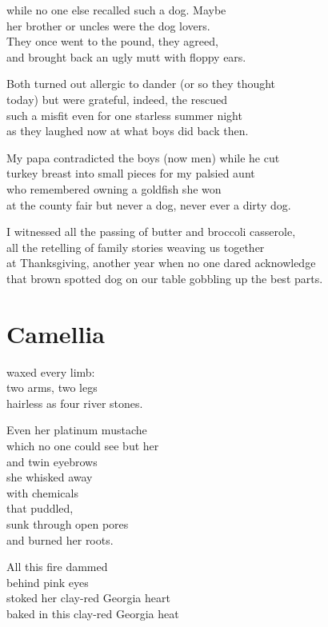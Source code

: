 \documentclass[twoside,10pt]{book}
\begin{document}
while no one else recalled such a dog. Maybe\\
her brother or uncles were the dog lovers.\\
They once went to the pound, they agreed,\\
and brought back an ugly mutt with floppy ears.

Both turned out allergic to dander (or so they thought\\
today) but were grateful, indeed, the rescued\\
such a misfit even for one starless summer night\\
as they laughed now at what boys did back then.

My papa contradicted the boys (now men) while he cut\\
turkey breast into small pieces for my palsied aunt\\
who remembered owning a goldfish she won\\
at the county fair but never a dog, never ever a dirty dog.

I witnessed all the passing of butter and broccoli casserole,\\
all the retelling of family stories weaving us together\\
at Thanksgiving, another year when no one dared acknowledge\\
that brown spotted dog on our table gobbling up the best parts.


\clearpage
\section{Camellia}

waxed every limb:\\
two arms, two legs\\
hairless as four river stones.

Even her platinum mustache\\
which no one could see but her\\
and twin eyebrows\\
she whisked away\\
with chemicals\\
that puddled,\\
sunk through open pores\\
and burned her roots.

All this fire dammed\\
behind pink eyes\\
stoked her clay-red Georgia heart\\
baked in this clay-red Georgia heat
\end{document}
